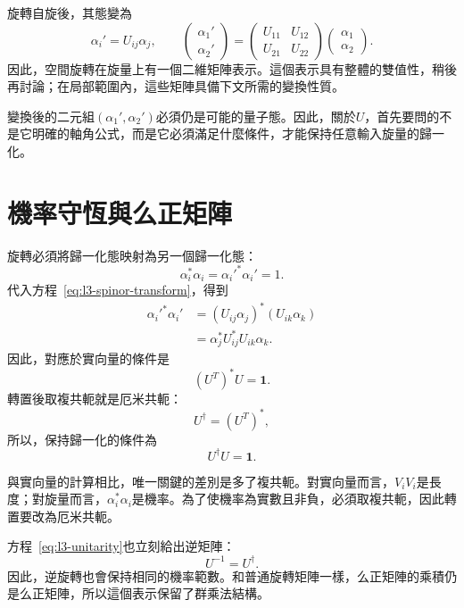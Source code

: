 旋轉自旋後，其態變為
\begin{equation}
\alpha_i'=U_{ij}\alpha_j,
\qquad
\begin{pmatrix}\alpha_1'\\\alpha_2'\end{pmatrix}
=
\begin{pmatrix}
U_{11}&U_{12}\\
U_{21}&U_{22}
\end{pmatrix}
\begin{pmatrix}\alpha_1\\\alpha_2\end{pmatrix}.
\label{eq:l3-spinor-transform}
\end{equation}
因此，空間旋轉在旋量上有一個二維矩陣表示。這個表示具有整體的雙值性，稍後再討論；在局部範圍內，這些矩陣具備下文所需的變換性質。

變換後的二元組\((\alpha_1',\alpha_2')\)必須仍是可能的量子態。因此，關於\(U\)，首先要問的不是它明確的軸角公式，而是它必須滿足什麼條件，才能保持任意輸入旋量的歸一化。

\section{機率守恆與么正矩陣}

旋轉必須將歸一化態映射為另一個歸一化態：
\begin{equation}
\alpha_i^*\alpha_i=\alpha_i'^*\alpha_i'=1.
\end{equation}
代入方程~\eqref{eq:l3-spinor-transform}，得到
\begin{align}
\alpha_i'^*\alpha_i'
 &=(U_{ij}\alpha_j)^*(U_{ik}\alpha_k)\\
 &=\alpha_j^*U_{ij}^*U_{ik}\alpha_k.
\end{align}
因此，對應於實向量的條件是
\begin{equation}
(U^T)^*U=\boldsymbol 1.
\end{equation}
轉置後取複共軛就是厄米共軛：
\begin{equation}
U^\dagger=(U^T)^*,
\end{equation}
所以，保持歸一化的條件為
\begin{equation}
U^\dagger U=\boldsymbol 1.
\label{eq:l3-unitarity}
\end{equation}

與實向量的計算相比，唯一關鍵的差別是多了複共軛。對實向量而言，\(V_iV_i\)是長度；對旋量而言，\(\alpha_i^*\alpha_i\)是機率。為了使機率為實數且非負，必須取複共軛，因此轉置要改為厄米共軛。

方程~\eqref{eq:l3-unitarity}也立刻給出逆矩陣：
\begin{equation}
U^{-1}=U^\dagger.
\end{equation}
因此，逆旋轉也會保持相同的機率範數。和普通旋轉矩陣一樣，么正矩陣的乘積仍是么正矩陣，所以這個表示保留了群乘法結構。

